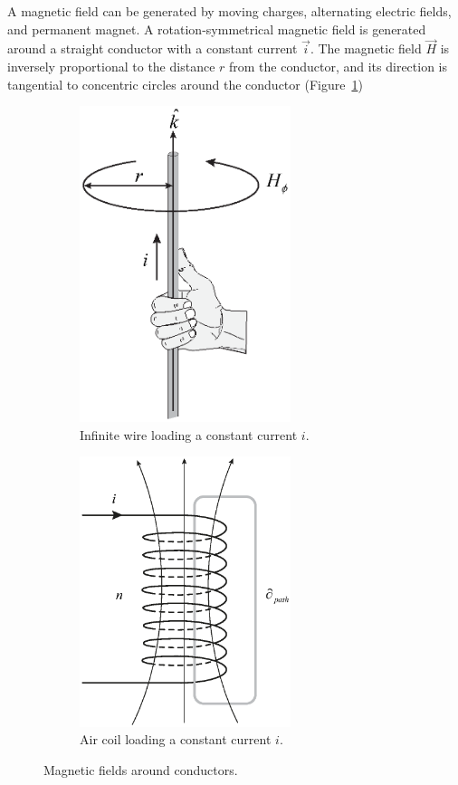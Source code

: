 \documentclass[11pt,a4paper,oneside]{book}
\numberwithin{equation}{section}
\theoremstyle{it}
\theoremstyle{definition}
\begin{document}
A magnetic field can be generated by moving charges, alternating electric fields, and permanent magnet. A rotation-symmetrical magnetic field is generated around a straight conductor with a constant current $\vec{i}$. The magnetic field $\vec{H}$ is inversely proportional to the distance $r$ from the conductor, and its direction is tangential to concentric circles around the conductor (Figure~\ref{infinite_wire})
\begin{figure}[H]
	\centering
	\begin{subfigure}{0.5\textwidth}
		\centering
		\includegraphics[width = 175pt, angle = 0, 
		keepaspectratio]{figures/magnetic_bearing/infinite_wire.eps}
		\captionsetup{width=0.5\textwidth, font=footnotesize}	
		\caption{Infinite wire loading a constant current $i$.}
		\label{infinite_wire}
	\end{subfigure}%
	\begin{subfigure}{0.5\textwidth}
		\centering
		\includegraphics[width = 175pt, angle = 0, 
		keepaspectratio]{figures/magnetic_bearing/solenoid.eps}
		\captionsetup{width=0.5\textwidth, font=footnotesize}	
		\caption{Air coil loading a constant current $i$.}
		\label{solenoid}
	\end{subfigure}
	\captionsetup{width=0.5\textwidth, font=small}	
	\caption{Magnetic fields around conductors.}
	\label{}
\end{figure}
\end{document}
